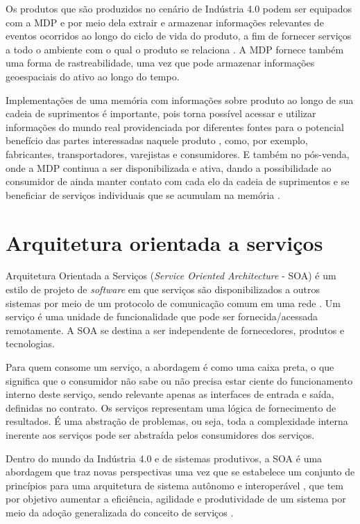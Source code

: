 Os produtos que são produzidos no cenário de Indústria 4.0 podem ser equipados com a MDP e por meio dela extrair e armazenar informações relevantes de eventos ocorridos ao longo do ciclo de vida do produto, a fim de fornecer serviços a todo o ambiente com o qual o produto se relaciona \cite{brandherm2011productmemory}. A MDP fornece também uma forma de rastreabilidade, uma vez que pode armazenar informações geoespaciais do ativo ao longo do tempo.

Implementações de uma memória com informações sobre produto ao longo de sua cadeia de suprimentos é importante, pois torna possível acessar e utilizar informações do mundo real providenciada por diferentes fontes para o potencial benefício das partes interessadas naquele produto \cite{brandherm2011productmemory}, como, por exemplo, fabricantes, transportadores, varejistas e consumidores. E também no pós-venda, onde a MDP continua a ser disponibilizada e ativa, dando a possibilidade ao consumidor de ainda manter contato com cada elo da cadeia de suprimentos e se beneficiar de serviços individuais que se acumulam na memória \cite{brandherm2011productmemory}.

\section{Arquitetura orientada a serviços}
\label{sec:soa}

Arquitetura Orientada a Serviços (\textit{Service Oriented Architecture} - SOA) é um estilo de projeto de \textit{software} em que serviços são disponibilizados a outros sistemas por meio de um protocolo de comunicação comum em uma rede \cite{bell2008soa}. Um serviço é uma unidade de funcionalidade que pode ser fornecida/acessada remotamente. A SOA se destina a ser independente de fornecedores, produtos e tecnologias.

Para quem consome um serviço, a abordagem é como uma caixa preta, o que significa que o consumidor não sabe ou não precisa estar ciente do funcionamento interno deste serviço, sendo relevante apenas as interfaces de entrada e saída, definidas no contrato. Os serviços representam uma lógica de fornecimento de resultados. É uma abstração de problemas, ou seja, toda a complexidade interna inerente aos serviços pode ser abstraída pelos consumidores dos serviços.

Dentro do mundo da Indústria 4.0 e de sistemas produtivos, a SOA é uma abordagem que traz novas perspectivas uma vez que se estabelece um conjunto de princípios para uma arquitetura de sistema autônomo e interoperável \cite{candido2009soa}, que tem por objetivo aumentar a eficiência, agilidade e produtividade de um sistema por meio da adoção generalizada do conceito de serviços \cite{souit2013soa}.

